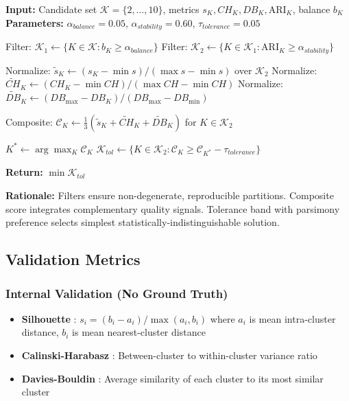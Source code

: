 \begin{algorithm}[h]
\caption{Evidence-Based K Selection}
\label{alg:kselection}
\begin{algorithmic}[1]
\State \textbf{Input:} Candidate set $\mathcal{K} = \{2, \ldots, 10\}$, metrics $s_K, CH_K, DB_K, \text{ARI}_K$, balance $b_K$
\State \textbf{Parameters:} $\alpha_{balance} = 0.05$, $\alpha_{stability} = 0.60$, $\tau_{tolerance} = 0.05$

\State Filter: $\mathcal{K}_1 \leftarrow \{K \in \mathcal{K} : b_K \geq \alpha_{balance}\}$ 
\State Filter: $\mathcal{K}_2 \leftarrow \{K \in \mathcal{K}_1 : \text{ARI}_K \geq \alpha_{stability}\}$ 

\State Normalize: $\tilde{s}_K \leftarrow (s_K - \min s) / (\max s - \min s)$ over $\mathcal{K}_2$
\State Normalize: $\tilde{CH}_K \leftarrow (CH_K - \min CH) / (\max CH - \min CH)$
\State Normalize: $\tilde{DB}_K \leftarrow (DB_{\max} - DB_K) / (DB_{\max} - DB_{\min})$ 

\State Composite: $\mathcal{C}_K \leftarrow \frac{1}{3}(\tilde{s}_K + \tilde{CH}_K + \tilde{DB}_K)$ for $K \in \mathcal{K}_2$

\State $K^* \leftarrow \arg\max_{K} \mathcal{C}_K$
\State $\mathcal{K}_{tol} \leftarrow \{K \in \mathcal{K}_2 : \mathcal{C}_K \geq \mathcal{C}_{K^*} - \tau_{tolerance}\}$ 

\State \textbf{Return:} $\min \mathcal{K}_{tol}$ 
\end{algorithmic}
\end{algorithm}

\textbf{Rationale:} Filters ensure non-degenerate, reproducible partitions. Composite score integrates complementary quality signals. Tolerance band with parsimony preference selects simplest statistically-indistinguishable solution.

\subsection{Validation Metrics}
\label{sec:validation}

\subsubsection{Internal Validation (No Ground Truth)}

\begin{itemize}
    \item \textbf{Silhouette} \cite{rousseeuw1987silhouettes}: $s_i = (b_i - a_i) / \max(a_i, b_i)$ where $a_i$ is mean intra-cluster distance, $b_i$ is mean nearest-cluster distance
    \item \textbf{Calinski-Harabasz} \cite{calinski1974dendrite}: Between-cluster to within-cluster variance ratio
    \item \textbf{Davies-Bouldin} \cite{davies1979cluster}: Average similarity of each cluster to its most similar cluster
\end{itemize}

